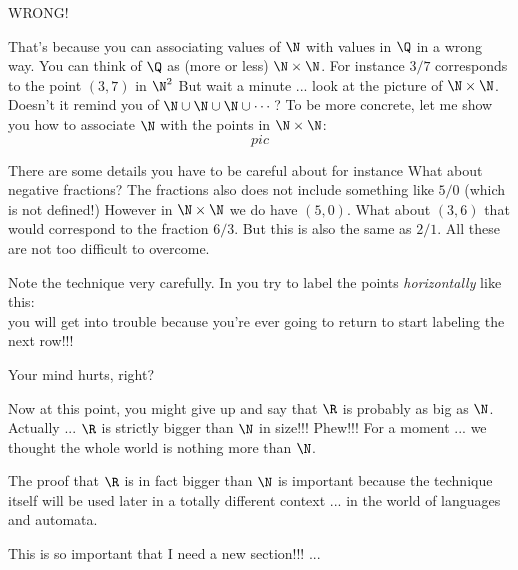 WRONG!

That's because you can associating values of $\N$ with values in $\Q$
in a wrong way.
You can think of $\Q$ as (more or less) $\N \times \N$.
For instance $3/7$ corresponds to the point $(3, 7)$ in $\N^2$
But wait a minute ... look at the picture of $\N \times \N$.
Doesn't it remind you of $\N \cup \N \cup \N \cup \cdots$?
To be more concrete, let me show you how to associate $\N$ with
the points in $\N \times \N$:
\[
pic
\]

There are some details you have to be careful about for instance
What about negative fractions?
The fractions also does not include something like $5/0$
(which is not defined!)
However in $\N \times \N$ we do have $(5, 0)$.
What about $(3, 6)$ that would correspond to the fraction $6/3$.
But this is also the same as $2/1$.
All these are not too difficult to overcome.

Note the technique very carefully.
In you try to label the points \textit{horizontally} like this:
\[
\]
you will get into trouble because you're ever going to return to 
start labeling the next row!!!

Your mind hurts, right?



Now at this point, you might give up and say that $\R$ is probably
as big as $\N$.
Actually ... $\R$ is strictly bigger than $\N$ in size!!!
Phew!!! For a moment ... we thought the whole world is nothing more than
$\N$.

The proof that $\R$ is in fact bigger than $\N$ is important 
because the technique itself will be used later in a totally different
context ... in the world of languages and automata.

This is so important that I need a new section!!! ...
